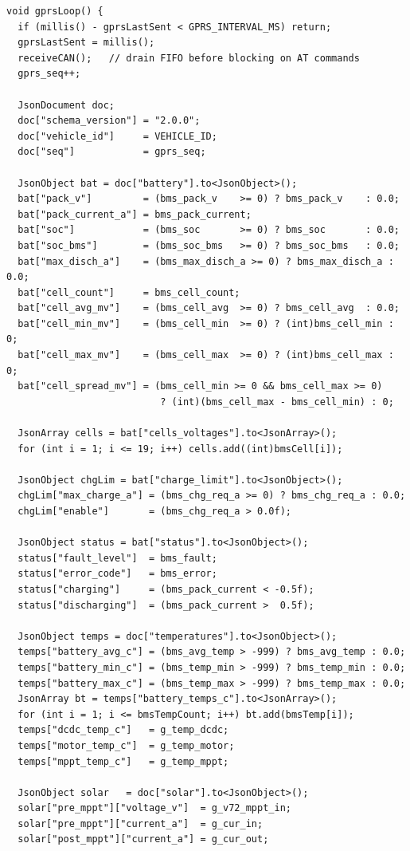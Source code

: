 \begin{lstlisting}[caption={GPRS heartbeat --- schema 2.0.0 JSON assembly}, label={lst:fw-json}]
void gprsLoop() {
  if (millis() - gprsLastSent < GPRS_INTERVAL_MS) return;
  gprsLastSent = millis();
  receiveCAN();   // drain FIFO before blocking on AT commands
  gprs_seq++;

  JsonDocument doc;
  doc["schema_version"] = "2.0.0";
  doc["vehicle_id"]     = VEHICLE_ID;
  doc["seq"]            = gprs_seq;

  JsonObject bat = doc["battery"].to<JsonObject>();
  bat["pack_v"]         = (bms_pack_v    >= 0) ? bms_pack_v    : 0.0;
  bat["pack_current_a"] = bms_pack_current;
  bat["soc"]            = (bms_soc       >= 0) ? bms_soc       : 0.0;
  bat["soc_bms"]        = (bms_soc_bms   >= 0) ? bms_soc_bms   : 0.0;
  bat["max_disch_a"]    = (bms_max_disch_a >= 0) ? bms_max_disch_a : 0.0;
  bat["cell_count"]     = bms_cell_count;
  bat["cell_avg_mv"]    = (bms_cell_avg  >= 0) ? bms_cell_avg  : 0.0;
  bat["cell_min_mv"]    = (bms_cell_min  >= 0) ? (int)bms_cell_min : 0;
  bat["cell_max_mv"]    = (bms_cell_max  >= 0) ? (int)bms_cell_max : 0;
  bat["cell_spread_mv"] = (bms_cell_min >= 0 && bms_cell_max >= 0)
                           ? (int)(bms_cell_max - bms_cell_min) : 0;

  JsonArray cells = bat["cells_voltages"].to<JsonArray>();
  for (int i = 1; i <= 19; i++) cells.add((int)bmsCell[i]);

  JsonObject chgLim = bat["charge_limit"].to<JsonObject>();
  chgLim["max_charge_a"] = (bms_chg_req_a >= 0) ? bms_chg_req_a : 0.0;
  chgLim["enable"]       = (bms_chg_req_a > 0.0f);

  JsonObject status = bat["status"].to<JsonObject>();
  status["fault_level"]  = bms_fault;
  status["error_code"]   = bms_error;
  status["charging"]     = (bms_pack_current < -0.5f);
  status["discharging"]  = (bms_pack_current >  0.5f);

  JsonObject temps = doc["temperatures"].to<JsonObject>();
  temps["battery_avg_c"] = (bms_avg_temp > -999) ? bms_avg_temp : 0.0;
  temps["battery_min_c"] = (bms_temp_min > -999) ? bms_temp_min : 0.0;
  temps["battery_max_c"] = (bms_temp_max > -999) ? bms_temp_max : 0.0;
  JsonArray bt = temps["battery_temps_c"].to<JsonArray>();
  for (int i = 1; i <= bmsTempCount; i++) bt.add(bmsTemp[i]);
  temps["dcdc_temp_c"]   = g_temp_dcdc;
  temps["motor_temp_c"]  = g_temp_motor;
  temps["mppt_temp_c"]   = g_temp_mppt;

  JsonObject solar   = doc["solar"].to<JsonObject>();
  solar["pre_mppt"]["voltage_v"]  = g_v72_mppt_in;
  solar["pre_mppt"]["current_a"]  = g_cur_in;
  solar["post_mppt"]["current_a"] = g_cur_out;


\end{lstlisting}
